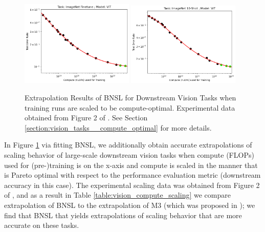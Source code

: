 \documentclass{article} %
\begin{document}
\FloatBarrier

\begin{figure}[htbp]
    \centering
\includegraphics[width=0.48\textwidth]{figures/compute/vision/Task_ImageNet_Finetune__Model_ViT__BNSL.png}
\includegraphics[width=0.48\textwidth]{figures/compute/vision/Task_ImageNet_10-Shot__Model_ViT__BNSL.png}

    \caption{
Extrapolation Results of BNSL for Downstream Vision Tasks when training runs are scaled to be compute-optimal. Experimental data obtained from Figure 2 of \cite{DBLP:journals/corr/abs-2106-04560}. See Section \ref{section:vision_tasks__compute_optimal} for more details.
    }
    \label{fig:vision_compute_scaling}
\end{figure}

In Figure \ref{fig:vision_compute_scaling} via fitting BNSL, we additionally obtain accurate extrapolations of scaling behavior of large-scale downstream vision tasks when compute (FLOPs) used for (pre-)training is on the x-axis and compute is scaled in the manner that is Pareto optimal with respect to the performance evaluation metric (downstream accuracy in this case). The experimental scaling data was obtained from Figure 2 of \cite{DBLP:journals/corr/abs-2106-04560}, and as a result in Table \ref{table:vision_compute_scaling} we compare extrapolation of BNSL to the extrapolation of M3 (which was proposed in \cite{DBLP:journals/corr/abs-2106-04560}); we find that BNSL that yields extrapolations of scaling behavior that are more accurate on these tasks.
\end{document}
